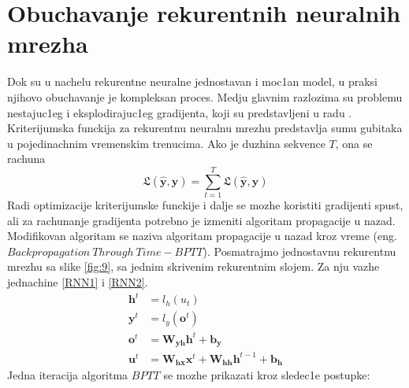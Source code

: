 \documentclass[a4paper, openany, oneside, 11pt]{book}
\begin{document}
\section{Obuchavanje rekurentnih neuralnih mrezha}
Dok su u nachelu rekurentne neuralne jednostavan i moc1an model, u praksi njihovo obuchavanje je kompleksan proces. Medju glavnim razlozima su problemu nestajuc1eg i eksplodirajuc1eg gradijenta, koji su predstavljeni u radu \cite{Bengio}. Kriterijumska funckija za rekurentnu neuralnu mrezhu predstavlja sumu gubitaka u pojedinachnim vremenskim trenucima. Ako je duzhina sekvence $T$, ona se rachuna 
\begin{equation}
\mathfrak{L}(\mathbf{\hat{y}},\mathbf{y}) = \sum^{T}_{t=1}\mathfrak{L}(\mathbf{\hat{y}},\mathbf{y})
\end{equation}
Radi optimizacije kriterijumske funckije i dalje se mozhe koristiti gradijenti spust, ali za rachunanje gradijenta potrebno je izmeniti algoritam propagacije u nazad. Modifikovan algoritam se naziva algoritam propagacije u nazad kroz vreme \cite{BPTT} (eng. $Backpropagation\ Through\ Time - BPTT$). Posmatrajmo jednostavnu rekurentnu mrezhu sa slike \ref{fig:9}, sa jednim skrivenim rekurentnim slojem. Za nju vazhe jednachine \ref{RNN1} i \ref{RNN2}.
\begin{align}
\mathbf{h}^t &= l_h(u_t)\\
\mathbf{y}^t &= l_y(\mathbf{o}^t)\\
\mathbf{o}^t &= \mathbf{W_{yh}}\mathbf{h}^t+\mathbf{b_y}\\
\mathbf{u}^t &= \mathbf{W_{hx}}\mathbf{x}^t+\mathbf{W_{hh}}\mathbf{h}^{t-1}+\mathbf{b_h} 
\end{align}
Jedna iteracija algoritma $BPTT$ se mozhe prikazati kroz sledec1e postupke:
\renewcommand{\labelenumii}{\arabic{enumii}.}
\end{document}
